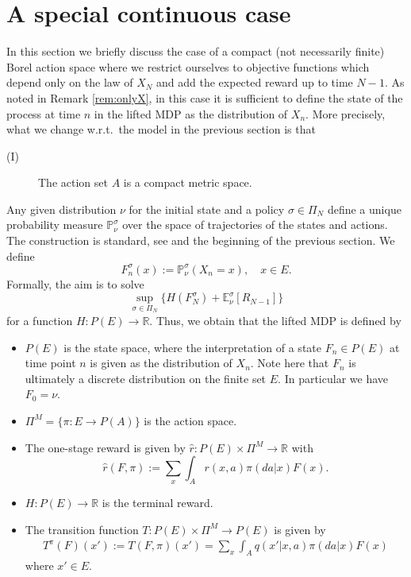 \documentclass[reqno, 12pt]{amsart}%
\newcommand{\R}{\mathbb{R}} %
\newcommand{\PP}{\mathbb{P}}
\newcommand{\EE}{\mathbb{E}}
\theoremstyle{definition}
\numberwithin{equation}{section} \numberwithin{theorem}{section}
\begin{document}
 \section{A special continuous case} \label{sec:special}
In this section we briefly discuss the case of 
a compact (not necessarily finite) Borel 
action space where we restrict ourselves to 
objective functions which depend only on the 
law of $X_N$ and add the expected reward up to 
time $N-1$. 
As noted in Remark \ref{rem:onlyX}, in this case it is sufficient to define the state of the process at time $n$ in the lifted MDP as the distribution of $X_n$.  More precisely, what we change w.r.t.\ the model in the previous section is that
\begin{description}
\item[(I)] The action set $A$ is a compact metric space.
\end{description}
Any given distribution $\nu$ for the initial state and a policy $\sigma\in\Pi_N$  
define a unique probability measure 
$\PP_\nu^\sigma$  over the space of trajectories of
the states and actions. The construction
is standard, see \cite{puterman2014markov} and the beginning of the previous section. 
We define
$$ F_n^\sigma(x) := \PP_\nu^\sigma(X_{n}=x), \quad x\in E.$$  Formally, the aim is to solve
\begin{equation}\label{eq:prob+}
    \sup_{\sigma\in \Pi_N} \Big\{ H(F_N^\sigma) +  \EE_\nu^\sigma [R_{N-1}] \Big\} 
\end{equation} 
for a function $H:P(E) \to \R.$
Thus, we obtain that the lifted MDP is defined by
\begin{itemize}
\item[(i)] $P(E)$  is the  state space, where the interpretation of a  state $F_n\in P(E)$ at time point $n$ is given as the  distribution of $X_{n}$. Note here that  $F_n$ is ultimately a discrete distribution on the finite set $E$.  In particular we have $F_0=\nu.$
\item[(ii)] $ \Pi^M = \{\pi:E \to P(A)\}$
 is the action space.
 \item[(iii)] The  one-stage reward is given by $\hat r : P(E)\times \Pi^M \to \R$ with $$\hat r (F,\pi) := \sum_x \int_A r(x,a) \pi(da|x) F(x).$$
 \item[(iv)] $H:P(E) \to \R$ is the  terminal reward.
 \item[(v)] The transition function $T:P(E) \times \Pi^M \to P(E)$  is given by 
\begin{align}\label{eq:Toperator2}
    T^\pi(F)(x') :=  T(F,\pi)(x')=\sum_{x} \int_A  q(x'|x,a)\pi(da|x) F(x)
\end{align} 
where $x' \in E$.
\end{itemize}
\end{document}
